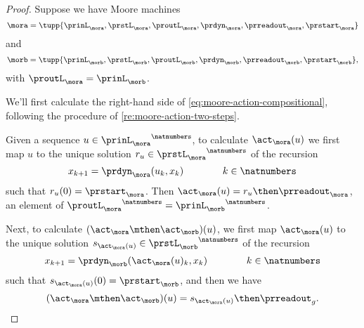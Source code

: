 \begin{proof}
Suppose we have Moore machines 
\begin{equation}
    \mora = \tupp{\prinL_{\mora},\prstL_{\mora},\proutL_{\mora},\prdyn_{\mora},\prreadout_{\mora},\prstart_{\mora}}
\end{equation}
%
and
%
\begin{equation}
    \morb = \tupp{\prinL_{\morb},\prstL_{\morb},\proutL_{\morb},\prdyn_{\morb},\prreadout_{\morb},\prstart_{\morb}},
\end{equation}
with $\proutL_\mora = \prinL_\morb$. 

We'll first calculate the right-hand side of \cref{eq:moore-action-compositional}, following the procedure of \cref{re:moore-action-two-steps}. 

Given a sequence $u \in {\prinL_{\mora}}^\natnumbers$, to calculate $\act_\mora(u)$ we first map $u$ to the unique solution $r_u \in {\prstL_{\mora}}^\natnumbers$ of the recursion
\begin{equation}
        x_{k+1} = \prdyn_\mora(u_k, x_k)  \qquad \qquad k \in \natnumbers
\end{equation}
such that $r_u(0) = \prstart_{\mora}$. Then $\act_\mora(u) = r_u \then \prreadout_\mora$, an element of ${\proutL_{\mora}}^\natnumbers = {\prinL_{\morb}}^\natnumbers$.

Next, to calculate $(\act_\mora \mthen \act_\morb)(u)$, we first map $\act_\mora(u)$ to the unique solution $s_{\act_\mora(u)} \in {\prstL_{\morb}}^\natnumbers$ of the recursion 
\begin{equation}
        x_{k+1} = \prdyn_\morb(\act_\mora(u)_k, x_k)  \qquad \qquad k \in \natnumbers
\end{equation}
such that $s_{\act_\mora(u)}(0) = \prstart_{\morb}$, and then we have
\begin{equation}
\label{eq:Moore-act-composition-1}
(\act_\mora \mthen \act_\morb)(u) = s_{\act_\mora(u)} \then \prreadout_g.
\end{equation}


\end{proof}
